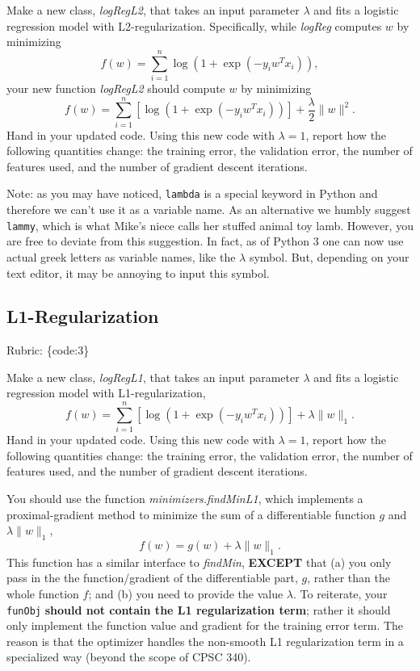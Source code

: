 \documentclass{article}
\def\rubric#1{\gre{Rubric: \{#1\}}}{}
\def\blu#1{{\color{blu}#1}}
\def\gre#1{{\color{gre}#1}}
\def\norm#1{\|#1\|}
\begin{document}
Make a new class, \emph{logRegL2}, that takes an input parameter $\lambda$ and fits a logistic regression model with L2-regularization. Specifically, while \emph{logReg} computes $w$ by minimizing
\[
f(w) = \sum_{i=1}^n \log(1+\exp(-y_iw^Tx_i)),
\]
your new function \emph{logRegL2} should compute $w$ by minimizing
\[
f(w) = \sum_{i=1}^n \left[\log(1+\exp(-y_iw^Tx_i))\right] + \frac{\lambda}{2}\norm{w}^2.
\]
\blu{Hand in your updated code. Using this new code with $\lambda = 1$, report how the following quantities change: the training error, the validation error, the number of features used, and the number of gradient descent iterations.}

Note: as you may have noticed, \texttt{lambda} is a special keyword in Python and therefore we can't use it as a variable name.
As an alternative we humbly suggest \texttt{lammy}, which is what Mike's niece calls her stuffed animal toy lamb.
However, you are free to deviate from this suggestion. In fact, as of Python 3 one can now use actual greek letters as variable names, like the $\lambda$ symbol. But, depending on your text editor, it may be annoying to input this symbol.


\subsection{L1-Regularization}
\rubric{code:3}

Make a new class, \emph{logRegL1}, that takes an input parameter $\lambda$ and fits a logistic regression model with L1-regularization,
\[
f(w) = \sum_{i=1}^n \left[\log(1+\exp(-y_iw^Tx_i))\right] + \lambda\norm{w}_1.
\]
\blu{Hand in your updated code. Using this new code with $\lambda = 1$, report how the following quantities change: the training error, the validation error, the number of features used, and the number of gradient descent iterations.}


You should use the function \emph{minimizers.findMinL1}, which implements a
proximal-gradient method to minimize the sum of a differentiable function $g$ and $\lambda\norm{w}_1$,
\[
f(w) = g(w) + \lambda \norm{w}_1.
\]
This function has a similar interface to \emph{findMin}, \textbf{EXCEPT} that (a) you
only pass in the the function/gradient of the differentiable
part, $g$, rather than the whole function $f$; and (b) you need to provide the value $\lambda$.
To reiterate, your \texttt{funObj} \textbf{should not contain the L1 regularization term}; rather it
should only implement the function value and gradient for the training error term. The reason is that 
the optimizer handles the non-smooth L1 regularization term in a specialized way (beyond the scope of CPSC 340).
\end{document}
